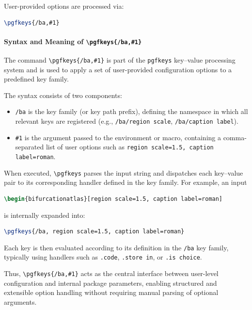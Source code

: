 User-provided options are processed via:

\begin{lstlisting}[language=LaTeX]
\pgfkeys{/ba,#1}
\end{lstlisting}
\paragraph{Syntax and Meaning of \texttt{\textbackslash pgfkeys\{/ba,\#1\}}}

The command \lstinline|\pgfkeys{/ba,#1}| is part of the \texttt{pgfkeys} key--value processing system and is used to apply a set of user-provided configuration options to a predefined key family.

The syntax consists of two components:

\begin{itemize}
\item \texttt{/ba} is the key family (or key path prefix), defining the namespace in which all relevant keys are registered (e.g., \texttt{/ba/region scale}, \texttt{/ba/caption label}).
\item \lstinline|#1| is the argument passed to the environment or macro, containing a comma-separated list of user options such as \texttt{region scale=1.5, caption label=roman}.
\end{itemize}

When executed, \lstinline|\pgfkeys| parses the input string and dispatches each key--value pair to its corresponding handler defined in the key family. For example, an input

\begin{lstlisting}[language=LaTeX]
\begin{bifurcationatlas}[region scale=1.5, caption label=roman]
\end{lstlisting}

is internally expanded into:

\begin{lstlisting}[language=LaTeX]
\pgfkeys{/ba, region scale=1.5, caption label=roman}
\end{lstlisting}

Each key is then evaluated according to its definition in the \texttt{/ba} key family, typically using handlers such as \lstinline|.code|, \lstinline|.store in|, or \lstinline|.is choice|.

Thus, \lstinline|\pgfkeys{/ba,#1}| acts as the central interface between user-level configuration and internal package parameters, enabling structured and extensible option handling without requiring manual parsing of optional arguments.

